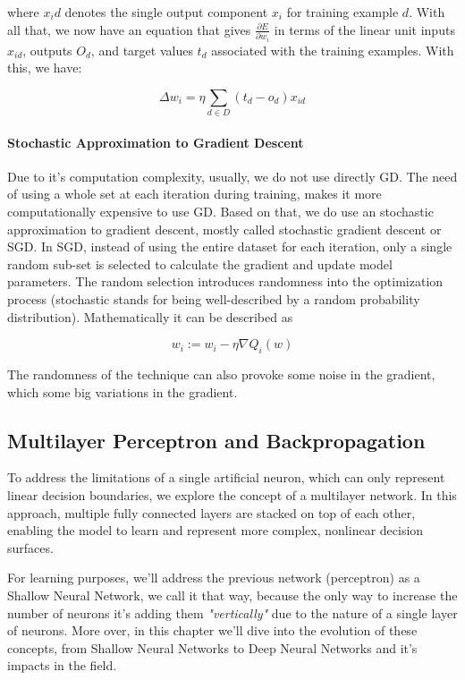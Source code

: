 \documentclass{tufte-handout}
\begin{document}
where $x_id$ denotes the single output component $x_i$ for training example $d$. With all that, we now have an equation that gives $\frac{\partial E}{\partial w_i}$ in terms of the linear unit inputs $x_{id}$, outputs $O_d$, and target values $t_d$ associated with the training examples. With this, we have:

\begin{equation}
    \Delta w_i = \eta \sum_{d \in D} (t_d - o_d)x_{id}
\end{equation}

\paragraph{Stochastic Approximation to Gradient Descent}
Due to it's computation complexity, usually, we do not use directly GD. The need of using a whole set at each iteration during training, makes it more computationally expensive to use GD. Based on that, we do use an stochastic approximation to gradient descent, mostly called stochastic gradient descent or SGD.
In SGD, instead of using the entire dataset for each iteration, only a single random sub-set is selected to calculate the gradient and update model parameters. The random selection introduces randomness into the optimization process (stochastic stands for being well-described by a random probability distribution). Mathematically it can be described as

\begin{equation}
    w_i := w_i - \eta \nabla Q_i (w)
\end{equation}

The randomness of the technique can also provoke some noise in the gradient, which some big variations in the gradient.

\subsection{Multilayer Perceptron and Backpropagation}
To address the limitations of a single artificial neuron, which can only represent linear decision boundaries, we explore the concept of a multilayer network. In this approach, multiple fully connected layers are stacked on top of each other, enabling the model to learn and represent more complex, nonlinear decision surfaces.

For learning purposes, we'll address the previous network (perceptron) as a Shallow Neural Network, we call it that way, because the only way to increase the number of neurons it's adding them \textit{"vertically"} due to the nature of a single layer of neurons. More over, in this chapter we'll dive into the evolution of these concepts, from Shallow Neural Networks to Deep Neural Networks and it's impacts in the field.
\end{document}
